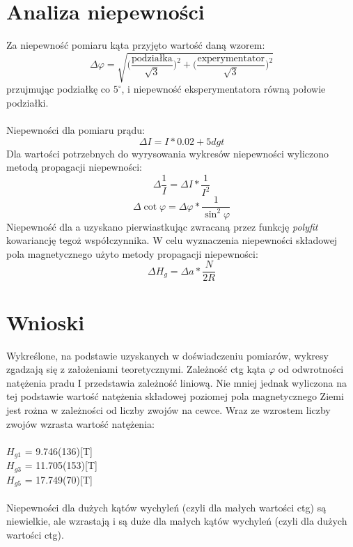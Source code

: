 \documentclass[a4paper,10pt]{article}
\begin{document}
\section{Analiza niepewności}
Za niepewność pomiaru kąta przyjęto wartość daną wzorem:
\begin{equation}
  \Delta \varphi = \sqrt{\bigg(\frac{\text{podziałka}}{\sqrt{3}}\bigg)^2+\bigg(\frac{\text{experymentator}}{\sqrt{3}}\bigg)^2}
\end{equation}
przujmując podziałkę co $5^\circ$, i niepewność eksperymentatora równą połowie podziałki.
\\
\\Niepewności dla pomiaru prądu:
\begin{equation}
  \Delta I = I*0.02+5dgt
\end{equation}
Dla wartości potrzebnych do wyrysowania wykresów niepewności wyliczono metodą propagacji niepewności:\\
\begin{equation}
  \Delta \frac{1}{I} = \Delta I * \frac{1}{I^2}
\end{equation}
\begin{equation}
  \Delta \cot{\varphi} = \Delta \varphi * \frac{1}{\sin^2{\varphi}}
\end{equation}
Niepewność dla a uzyskano pierwiastkując zwracaną przez funkcję \emph{polyfit} kowariancję tegoż współczynnika. W celu wyznaczenia niepewności składowej pola magnetycznego użyto %
metody propagacji niepewności:
\begin{equation}
  \Delta H_g = \Delta a * \frac{N}{2R}%
\end{equation}

\section{Wnioski}
Wykreślone, na podstawie uzyskanych w doświadczeniu pomiarów, wykresy zgadzają się z założeniami teoretycznymi. Zależność ctg kąta $\varphi$ od odwrotności natężenia pradu I przedstawia zależność liniową. Nie mniej jednak wyliczona na tej podstawie wartość  natężenia składowej poziomej pola magnetycznego Ziemi jest rożna w zależności od liczby zwojów na cewce. Wraz ze wzrostem liczby zwojów wzrasta wartość natężenia:
\\
\\$H_{g1}$ = 9.746(136)[T]
\\$H_{g3}$ = 11.705(153)[T]
\\$H_{g5}$ = 17.749(70)[T]
\\
\\Niepewności dla dużych kątów wychyleń (czyli dla małych wartości ctg) są niewielkie, ale wzrastają i są duże dla małych kątów wychyleń (czyli dla dużych wartości ctg).
\end{document}
